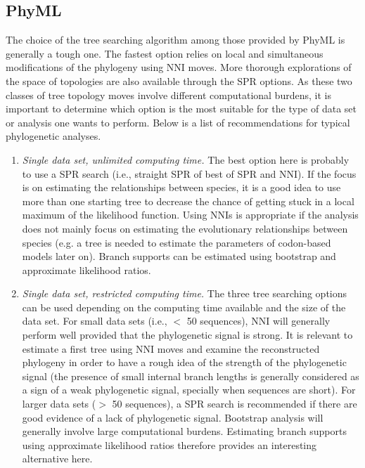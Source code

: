 \documentclass[a4paper,12pt]{article}
\begin{document}
\subsection{PhyML}

The choice of the  tree searching algorithm among those provided by PhyML  is generally a tough one.
The  fastest option  relies  on local  and simultaneous  modifications  of the  phylogeny using  NNI
moves. More  thorough explorations of  the space  of topologies are  also available through  the SPR
options.  As these  two classes of tree topology moves involve  different computational burdens, it
is important to determine which option is the most suitable for the type of data set or analysis one
wants to perform. Below is a list of recommendations for typical phylogenetic analyses.

\begin{enumerate}
\item {\em Single data set, unlimited computing time.} The best option here is probably to use a SPR
search (i.e., straight SPR of best of SPR and NNI).  If the focus is on estimating the relationships
between species,  it is a good  idea to use  more than one starting  tree to decrease the  chance of
getting stuck  in a  local maximum of  the likelihood  function.  Using NNIs  is appropriate  if the
analysis does not mainly focus on  estimating the evolutionary relationships between species (e.g. a
tree is needed to  estimate the parameters of codon-based models later  on).  Branch supports can be
estimated using bootstrap and approximate likelihood ratios.

\item {\em  Single data set, restricted  computing time.}  The  three tree searching options  can be
used depending on  the computing time available and the  size of the data set.   For small data sets
(i.e., $<$ 50 sequences),  NNI will generally perform well provided that  the phylogenetic signal is
strong.  It  is relevant  to estimate a  first tree  using NNI moves  and examine  the reconstructed
phylogeny in order to have a rough idea  of the strength of the phylogenetic signal (the presence of
small internal  branch lengths  is generally  considered as a  sign of  a weak  phylogenetic signal,
specially when  sequences are  short).  For larger  data sets  ($>$ 50 sequences),  a SPR  search is
recommended if there  are good evidence of  a lack of phylogenetic signal.   Bootstrap analysis will
generally  involve  large  computational  burdens.   Estimating branch  supports  using  approximate
likelihood ratios therefore provides an interesting alternative here.


\end{enumerate}
\end{document}
